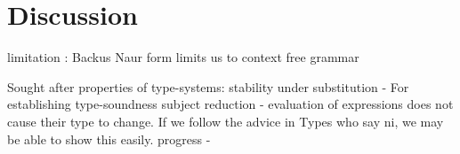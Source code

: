 \chapter{Discussion}

limitation : Backus Naur form limits us to context free grammar

Sought after properties of type-systems:
stability under substitution -
For establishing type-soundness
subject reduction - evaluation of expressions does not cause their
type to change. If we follow the advice in \cite{TypesWhoSayNi} Types
who say ni, we may be able to show this easily.
progress - 
